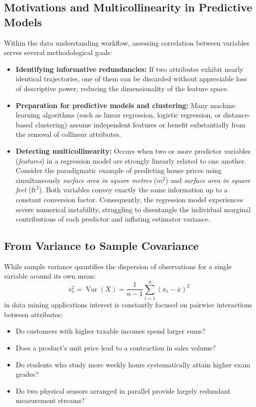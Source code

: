 \subsection{Motivations and Multicollinearity in Predictive Models}
Within the data understanding workflow, assessing correlation between variables serves several methodological goals:
\begin{itemize}
    \item \textbf{Identifying informative redundancies:} If two attributes exhibit nearly identical trajectories, one of them can be discarded without appreciable loss of descriptive power, reducing the dimensionality of the feature space.
    \item \textbf{Preparation for predictive models and clustering:} Many machine learning algorithms (such as linear regression, logistic regression, or distance-based clustering) assume independent features or benefit substantially from the removal of collinear attributes.
    \item \textbf{Detecting multicollinearity:} Occurs when two or more predictor variables (\textit{features}) in a regression model are strongly linearly related to one another. Consider the paradigmatic example of predicting house prices using simultaneously \textit{surface area in square metres} ($m^2$) and \textit{surface area in square feet} ($\text{ft}^2$). Both variables convey exactly the same information up to a constant conversion factor. Consequently, the regression model experiences severe numerical instability, struggling to disentangle the individual marginal contributions of each predictor and inflating estimator variance.
\end{itemize}

\subsection{From Variance to Sample Covariance}
While sample variance quantifies the dispersion of observations for a single variable around its own mean:
\begin{equation}
s_x^2 = \operatorname{Var}(X) = \frac{1}{n-1} \sum_{i=1}^n (x_i - \bar{x})^2
\end{equation}
in data mining applications interest is constantly focused on pairwise interactions between attributes:
\begin{itemize}
    \item Do customers with higher taxable incomes spend larger sums?
    \item Does a product's unit price lead to a contraction in sales volume?
    \item Do students who study more weekly hours systematically attain higher exam grades?
    \item Do two physical sensors arranged in parallel provide largely redundant measurement streams?
\end{itemize}

